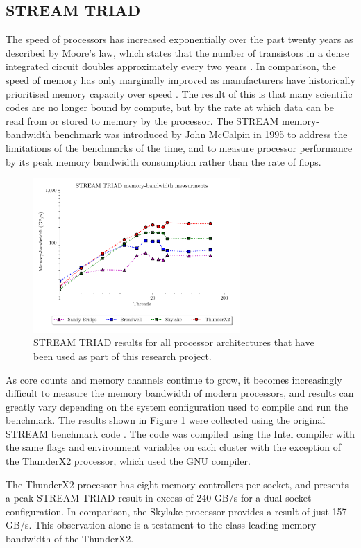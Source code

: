 \documentclass[a4paper,11pt]{report}
\begin{document}
\subsection{STREAM TRIAD}
The speed of processors has increased exponentially over the past twenty years as described by Moore's law, which states that the number of transistors in a dense integrated circuit doubles approximately every two years  \cite{moore1965cramming}. In comparison, the speed of memory has only marginally improved as manufacturers have historically prioritised memory capacity over speed \cite{mccalpin1995memory,patterson1997case}. The result of this is that many scientific codes are no longer bound by compute, but by the rate at which data can be read from or stored to memory by the processor. The STREAM memory-bandwidth benchmark was introduced by John McCalpin in 1995 to address the limitations of the benchmarks of the time, and to measure processor performance by its peak memory bandwidth consumption rather than the rate of \gls{flops}.
\begin{figure}[htbp]
\begin{center}
\includegraphics[width=0.7\textwidth]{img/stream-triad.pdf}
\caption[STREAM TRIAD benchmark]{STREAM TRIAD results for all processor architectures that have been used as part of this research project. }
\label{fig:bandwidth}
\end{center}
\end{figure}
\par 
As core counts and memory channels continue to grow, it becomes increasingly difficult to measure the memory bandwidth of modern processors, and results can greatly vary depending on the system configuration used to compile and run the benchmark. The results shown in Figure \ref{fig:bandwidth} were collected using the original STREAM benchmark code \cite{stream2019github}. The code was compiled using the Intel compiler with the same flags and environment variables on each cluster with the exception of the ThunderX2 processor, which used the GNU compiler. 
\par
The ThunderX2 processor has eight memory controllers per socket, and presents a peak STREAM TRIAD result in excess of 240 GB/s for a dual-socket configuration. In comparison, the Skylake processor provides a result of just 157 GB/s. This observation alone is a testament to the class leading memory bandwidth of the ThunderX2.
\end{document}
